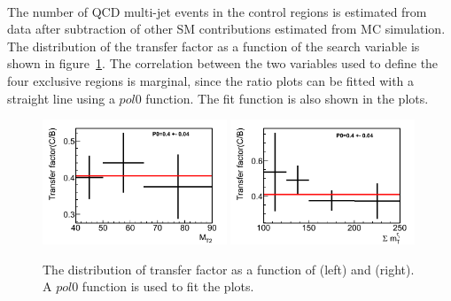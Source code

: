 \\The number of QCD multi-jet events in the control regions is estimated from data after subtraction 
of other SM contributions estimated from MC simulation. The distribution of the transfer factor as a 
function of the search variable is shown in figure~\ref{fig:1QCDbg}. The correlation 
between the two variables used to define the four exclusive regions is marginal, since the ratio plots can be fitted with a straight line using a $pol0$ function. The fit function is also shown in the plots.\\ 
\begin{figure}[!Hhtb]
\centering
\includegraphics[width=0.49\textwidth]{QCDbginTauTau/Bin1_transferfactor.png}
\includegraphics[width=0.49\textwidth]{QCDbginTauTau/Bin2_transferfactor.png} \\
\caption{The distribution of transfer factor as a function of \mttwo (left) and \SumMT (right). A $pol0$ function is used to fit the plots.}
\label{fig:1QCDbg}
\end{figure}


